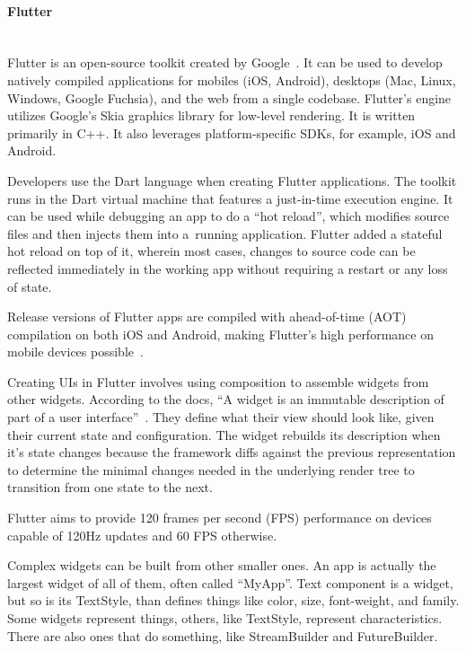 \paragraph{\large{Flutter}}\mbox{}\\[2pt]
Flutter is an open-source toolkit created by Google~\cite{flutter}. It can be used to develop natively compiled applications for mobiles (iOS, Android), desktops (Mac, Linux, Windows, Google Fuchsia), and the web from a single codebase. Flutter's engine utilizes Google's Skia graphics library for low-level rendering. It is written primarily in C++. It also leverages platform-specific SDKs, for example, iOS and Android.

Developers use the Dart language when creating Flutter applications. The toolkit runs in the Dart virtual machine that features a just-in-time execution engine. It can be used while debugging an app to do a ``hot reload'', which modifies source files and then injects them into a~running application. Flutter added a stateful hot reload on top of it, wherein most cases, changes to source code can be reflected immediately in the working app without requiring a restart or any loss of state.

Release versions of Flutter apps are compiled with ahead-of-time (AOT) compilation on both iOS and Android, making Flutter's high performance on mobile devices possible~\cite{flutter-wiki}.

Creating UIs in Flutter involves using composition to assemble widgets from other widgets. According to the docs, ``A widget is an immutable description of part of a user interface''~\cite{flutter}. They define what their view should look like, given their current state and configuration. The widget rebuilds its description when it's state changes because the framework diffs against the previous representation to determine the minimal changes needed in the underlying render tree to transition from one state to the next.

Flutter aims to provide 120 frames per second (FPS) performance on devices capable of 120Hz updates and 60 FPS otherwise.

Complex widgets can be built from other smaller ones. An app is actually the largest widget of all of them, often called ``MyApp''. Text component is a widget, but so is its TextStyle, than defines things like color, size, font-weight, and family. Some widgets represent things, others, like TextStyle, represent characteristics. There are also ones that do something, like StreamBuilder and FutureBuilder.

